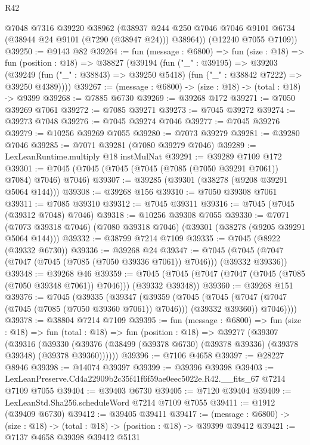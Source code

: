 \begin{lexlean}{R42}
\begin{coremodule}
{        @7048
        @7316
        @39220
        @38962
        (@38937 @244 @250 @7046 @7046 @9101 @6734 (@38944 @24 @9101 (@7290 (@38947 @24))) @38964))
      (@12240 @7055 @7109))
@39250 := @9143 @82
@39264 := fun (message : @6800) =>
  fun (size : @18) =>
  fun (position : @18) =>
  @38827
    (@39194
      (fun ("_" : @39195) =>
      @39203
        (@39249 (fun ("_" : @38843) => @39250 @5418) (fun ("_" : @38842 @7222) => @39250 @4389))))
@39267 := (message : @6800) -> (size : @18) -> (total : @18) -> @9399
@39268 := @7885 @6730
@39269 := @39268 @172
@39271 := @7050 @39269 @7061
@39272 := @7085 @39271
@39273 := @7045 @39272
@39274 := @39273 @7048
@39276 := @7045 @39274 @7046
@39277 := @7045 @39276
@39279 := @10256 @39269 @7055
@39280 := @7073 @39279
@39281 := @39280 @7046
@39285 := @7071 @39281 (@7080 @39279 @7046)
@39289 := LexLeanRuntime.multiply @18 instMulNat
@39291 := @39289 @7109 @172
@39301 := @7045 (@7045 (@7045 (@7045 (@7085 (@7050 @39291 @7061)) @7084) @7046) @7046)
@39307 := @39285 (@39301 (@38278 (@9208 @39291 @5064 @144)))
@39308 := @39268 @156
@39310 := @7050 @39308 @7061
@39311 := @7085 @39310
@39312 := @7045 @39311
@39316 := @7045 (@7045 (@39312 @7048) @7046)
@39318 := @10256 @39308 @7055
@39330 := @7071
    (@7073 @39318 @7046)
    (@7080 @39318 @7046)
    (@39301 (@38278 (@9205 @39291 @5064 @144)))
@39332 := @38799 @7214 @7109
@39335 := @7045 (@8922 (@39332 @6730))
@39336 := @39268 @24
@39347 := @7045 (@7045 (@7047 (@7047 (@7045 (@7085 (@7050 @39336 @7061)) @7046))) (@39332 @39336))
@39348 := @39268 @46
@39359 := @7045 (@7045 (@7047 (@7047 (@7045 (@7085 (@7050 @39348 @7061)) @7046))) (@39332 @39348))
@39360 := @39268 @151
@39376 := @7045
    (@39335
      (@39347
        (@39359
          (@7045
            (@7045 (@7047 (@7047 (@7045 (@7085 (@7050 @39360 @7061)) @7046))) (@39332 @39360))
            @7046))))
@39378 := @38804 @7214 @7109
@39395 := fun (message : @6800) =>
  fun (size : @18) =>
  fun (total : @18) =>
  fun (position : @18) =>
  @39277
    (@39307
      (@39316
        (@39330 (@39376 (@38499 (@39378 @6730) (@39378 @39336) (@39378 @39348) (@39378 @39360))))))
@39396 := @7106 @4658
@39397 := @28227 @8946
@39398 := @14074 @39397
@39399 := @39396 @39398
@39403 := LexLeanPreserve.Cd4a22909b2c35f41f6f59ae0eec5022e.R42.__fits_67 @7214 @7109 @7055
@39404 := @39403 @6730
@39405 := @7120 @39404
@39409 := LexLeanStd.Sha256.scheduleWord @7214 @7109 @7055
@39411 := @1912 (@39409 @6730)
@39412 := @39405 @39411
@39417 := (message : @6800) -> (size : @18) -> (total : @18) -> (position : @18) -> @39399 @39412
@39421 := @7137 @4658 @39398 @39412 @5131
}
\end{coremodule}
\end{lexlean}
